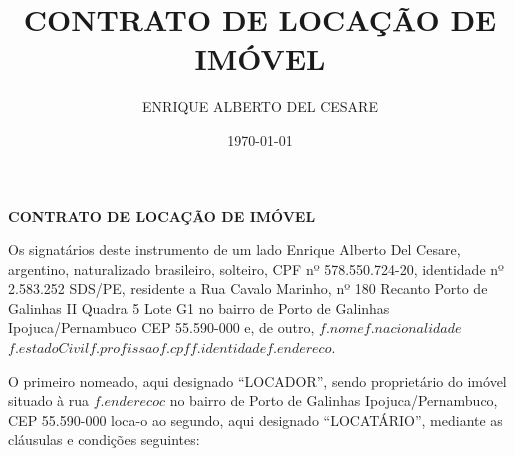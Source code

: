 \documentclass[a4paper,12pt]{article}
\date{\today}
\author{ENRIQUE ALBERTO DEL CESARE}
\title{CONTRATO DE LOCAÇÃO DE IMÓVEL}
\begin{document}
\thispagestyle{empty}
\begin{center}{\bf \huge CONTRATO DE LOCAÇÃO DE IMÓVEL}\\[5.1cm] \end{center} 
\newcommand\n{\newcommand}


Os signatários deste  instrumento de um lado Enrique Alberto Del Cesare,
argentino, naturalizado brasileiro, solteiro, CPF nº 578.550.724-20, identidade nº 2.583.252 SDS\//PE, 
residente a Rua Cavalo Marinho, nº 180 Recanto Porto de Galinhas II Quadra 5 Lote G1 
no bairro de Porto de Galinhas Ipojuca/Pernambuco CEP 55.590-000 e, de outro,
${f.nome}$${f.nacionalidade}$${f.estadoCivil}$${f.profissao}$${f.cpf}$${f.identidade}$${f.endereco}$. 

O primeiro nomeado, aqui designado “LOCADOR”, sendo proprietário do imóvel situado à rua ${f.enderecoc}$  
no bairro de Porto de Galinhas Ipojuca\//Pernambuco, CEP 55.590-000 loca-o ao segundo, aqui designado “LOCATÁRIO”, mediante as cláusulas e condições seguintes:
\end{document}
